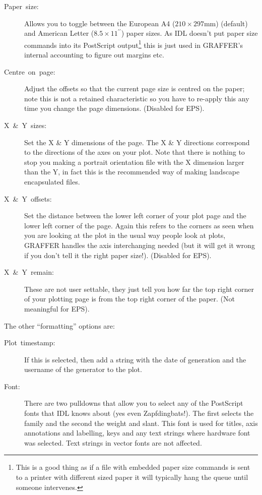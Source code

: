 \documentclass[11pt,twoside,english]{article}
\begin{document}
 \begin{description}
 \item [Paper~size:]Allows you to toggle between the European A4
   ($210\times297\mathrm{mm}$) (default) and American Letter
   ($8.5\times11^{\prime\prime}$) paper sizes. As IDL doesn't put paper
   size commands into its PostScript output\footnote{This is a good
     thing as if a file with embedded paper size commands is sent to a
     printer with different sized paper it will typically hang the
     queue until someone intervenes.} this is just used in GRAFFER's
   internal accounting to figure out margins etc.
 \item [Centre~on~page:]Adjust the offsets so that the current page
   size is centred on the paper; note this is not a retained
   characteristic so you have to re-apply this any time you change the
   page dimensions. (Disabled for EPS).
 \item [X~\&~Y~sizes:]Set the X \& Y dimensions of the page. The X \& Y
   directions correspond to the directions of the axes on your plot.
   Note that there is nothing to stop you making a portrait orientation
   file with the X dimension larger than the Y, in fact this is the
   recommended way of making landscape encapsulated files.
 \item [X~\&~Y~offsets:]Set the distance between the lower left corner
   of your plot page and the lower left corner of the page. Again this
   refers to the corners as seen when you are looking at the plot in
   the usual way people look at plots, GRAFFER handles the axis
   interchanging needed (but it will get it wrong if you don't tell it
   the right paper size!). (Disabled for EPS).
 \item [X~\&~Y~remain:]These are not user settable, they just tell you
   how far the top right corner of your plotting page is from the top
   right corner of the paper. (Not meaningful for EPS).
 \end{description}
 The other {}``formatting'' options are:

 \begin{description}
 \item [Plot~timestamp:]If this is selected, then add a string with the
   date of generation and the username of the generator to the plot.
 \item [Font:]There are two pulldowns that allow you to select any of
   the PostScript fonts that IDL knows about (yes even
   Zapfdingbats!). The first selects the family and the second the
   weight and slant. This font is used for titles, axis annotations and
   labelling, keys and any text strings where hardware font was
   selected. Text strings in vector fonts are not affected.
 \end{description}
\end{document}
